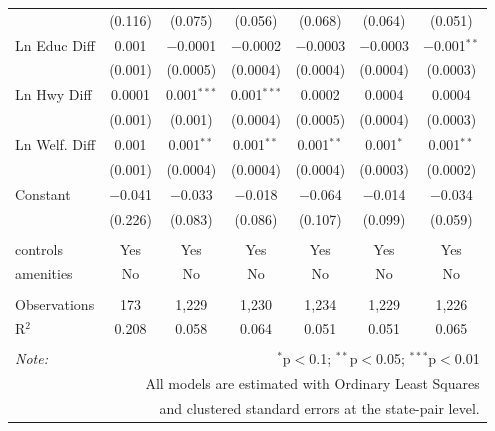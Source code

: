 \begin{table}[!htbp]
\begin{tabular}{@{\extracolsep{5pt}}lcccccc}
  & (0.116) & (0.075) & (0.056) & (0.068) & (0.064) & (0.051) \\ 
  Ln Educ Diff & 0.001 & $-$0.0001 & $-$0.0002 & $-$0.0003 & $-$0.0003 & $-$0.001$^{**}$ \\ 
  & (0.001) & (0.0005) & (0.0004) & (0.0004) & (0.0004) & (0.0003) \\ 
  Ln Hwy Diff & 0.0001 & 0.001$^{***}$ & 0.001$^{***}$ & 0.0002 & 0.0004 & 0.0004 \\ 
  & (0.001) & (0.001) & (0.0004) & (0.0005) & (0.0004) & (0.0003) \\ 
  Ln Welf. Diff & 0.001 & 0.001$^{**}$ & 0.001$^{**}$ & 0.001$^{**}$ & 0.001$^{*}$ & 0.001$^{**}$ \\ 
  & (0.001) & (0.0004) & (0.0004) & (0.0004) & (0.0003) & (0.0002) \\ 
  Constant & $-$0.041 & $-$0.033 & $-$0.018 & $-$0.064 & $-$0.014 & $-$0.034 \\ 
  & (0.226) & (0.083) & (0.086) & (0.107) & (0.099) & (0.059) \\ 
 \hline \\[-1.8ex] 
controls & Yes & Yes & Yes & Yes & Yes & Yes \\ 
amenities & No & No & No & No & No & No \\ 
\hline \\[-1.8ex] 
Observations & 173 & 1,229 & 1,230 & 1,234 & 1,229 & 1,226 \\ 
R$^{2}$ & 0.208 & 0.058 & 0.064 & 0.051 & 0.051 & 0.065 \\ 
\hline 
\hline \\[-1.8ex] 
\textit{Note:}  & \multicolumn{6}{r}{$^{*}$p$<$0.1; $^{**}$p$<$0.05; $^{***}$p$<$0.01} \\ 
 & \multicolumn{6}{r}{All models are estimated with Ordinary Least Squares} \\ 
 & \multicolumn{6}{r}{and clustered standard errors at the state-pair level.} \\ 
\end{tabular} 
\end{table} 
